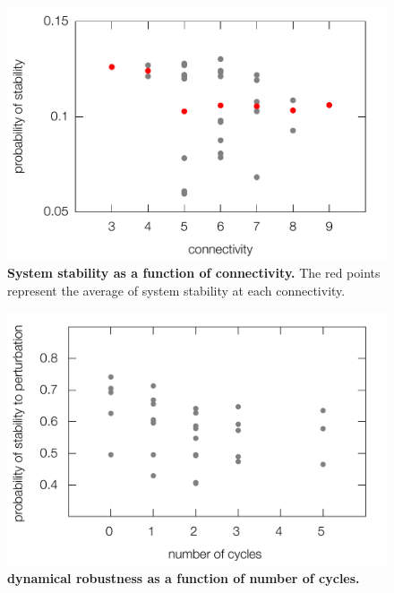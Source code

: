 \pagebreak

\begin{figure}[!ht]
\centering
\noindent\includegraphics[width=0.6\columnwidth]{fig/apstab3x3.pdf}
\caption{{\bf System stability as a function of connectivity.} The red points represent the average of system stability at each connectivity.}
\label{fig:apstab3x3}
\end{figure}

\pagebreak
\FloatBarrier

\begin{figure}[!ht]
\centering
\noindent\includegraphics[width=0.6\columnwidth]{fig/cycle3x3.pdf}
\caption{{\bf dynamical robustness as a function of number of cycles.} }
\label{fig:cycle3x3}
\end{figure}




